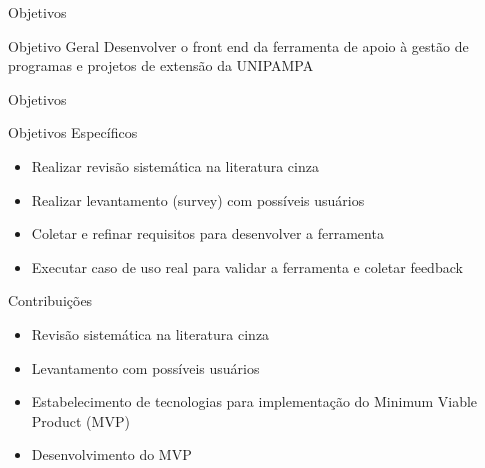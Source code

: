 \begin{frame}{{\sffamily Objetivos}}
  \begin{block}{Objetivo Geral}
    Desenvolver o front end da ferramenta de apoio à gestão de programas e projetos de extensão da UNIPAMPA
  \end{block}
\end{frame}

\begin{frame}{{\sffamily Objetivos}}
  \begin{block}{Objetivos Específicos}
    \begin{itemize}%
      \item Realizar revisão sistemática na literatura cinza
      \item Realizar levantamento (survey) com possíveis usuários
      \item Coletar e refinar requisitos para desenvolver a ferramenta
      \item Executar caso de uso real para validar a ferramenta  e coletar feedback
    \end{itemize}
  \end{block}
\end{frame}

\begin{frame}{{\sffamily Contribuições}}
  \begin{block}{}
    \begin{itemize}%
      \item Revisão sistemática na literatura cinza
      \item Levantamento com possíveis usuários
      \item Estabelecimento de tecnologias para implementação do Minimum Viable Product (MVP)
      \item Desenvolvimento do MVP
    \end{itemize}
  \end{block}
\end{frame}
